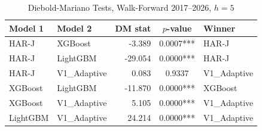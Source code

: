 \begin{table}[htbp]
\centering
\caption{Diebold-Mariano Tests, Walk-Forward 2017--2026, $h=5$}
\label{tab:dm_wf_h5}
\begin{tabular}{llrcl}
\toprule
Model 1 & Model 2 & DM stat & $p$-value & Winner \\
\midrule
HAR-J & XGBoost & -3.389 & 0.0007*** & HAR-J \\
HAR-J & LightGBM & -29.054 & 0.0000*** & HAR-J \\
HAR-J & V1\_Adaptive & 0.083 & 0.9337 & V1\_Adaptive \\
XGBoost & LightGBM & -11.870 & 0.0000*** & XGBoost \\
XGBoost & V1\_Adaptive & 5.105 & 0.0000*** & V1\_Adaptive \\
LightGBM & V1\_Adaptive & 24.214 & 0.0000*** & V1\_Adaptive \\
\bottomrule
\end{tabular}
\end{table}